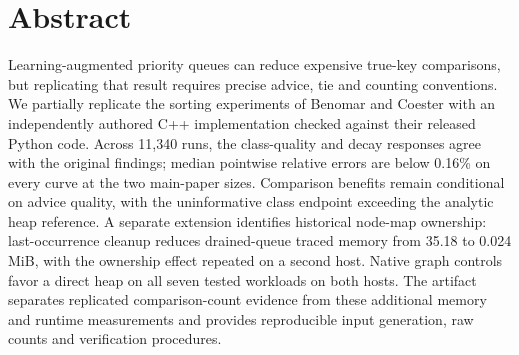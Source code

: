 \documentclass{rescience}
\begin{document}

\section*{Abstract}
Learning-augmented priority queues can reduce expensive true-key comparisons, but replicating that result requires precise advice, tie and counting conventions. We partially replicate the sorting experiments of Benomar and Coester with an independently authored C++ implementation checked against their released Python code. Across 11,340 runs, the class-quality and decay responses agree with the original findings; median pointwise relative errors are below 0.16\% on every curve at the two main-paper sizes. Comparison benefits remain conditional on advice quality, with the uninformative class endpoint exceeding the analytic heap reference. A separate extension identifies historical node-map ownership: last-occurrence cleanup reduces drained-queue traced memory from 35.18 to 0.024 MiB, with the ownership effect repeated on a second host. Native graph controls favor a direct heap on all seven tested workloads on both hosts. The artifact separates replicated comparison-count evidence from these additional memory and runtime measurements and provides reproducible input generation, raw counts and verification procedures.

\setlength\bibitemsep{0pt}
\printbibliography
\end{document}
